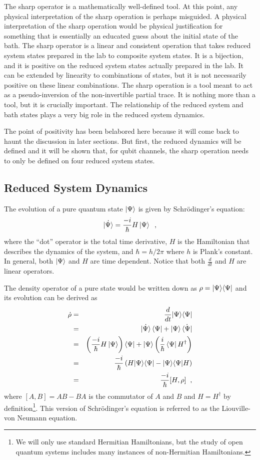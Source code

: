 The sharp operator is a mathematically well-defined tool.  At this point, any physical interpretation of the sharp operation is perhaps misguided.  A physical interpretation of the sharp operation would be physical justification for something that is essentially an educated guess about the initial state of the bath.  The sharp operator is a linear and consistent operation that takes reduced system states prepared in the lab to composite system states.  It is a bijection, and it is positive on the reduced system states actually prepared in the lab.  It can be extended by linearity to combinations of states, but it is not necessarily positive on these linear combinations.  The sharp operation is a tool meant to act as a pseudo-inversion of the non-invertible partial trace.  It is nothing more than a tool, but it is crucially important.  The relationship of the reduced system and bath states plays a very big role in the reduced system dynamics.  

The point of positivity has been belabored here because it will come back to haunt the discussion in later sections.  But first, the reduced dynamics will be defined and it will be shown that, for qubit channels, the sharp operation needs to only be defined on four reduced system states.

\subsection{Reduced System Dynamics}
\label{sec:map}      
The evolution of a pure quantum state $\left|\Psi\right\rangle$ is given by Schr\"{o}dinger's equation:
$$
\dot{\left|\Psi\right\rangle} = \frac{-i}{\hbar} H \left|\Psi\right\rangle\;\;,
$$
where the ``dot'' operator is the total time derivative, $H$ is the Hamiltonian that describes the dynamics of the system, and $\hbar=h/2\pi$ where $h$ is Plank's constant.  In general, both $\left|\Psi\right\rangle$ and $H$ are time dependent.  Notice that both $\frac{d}{dt}$ and $H$ are linear operators.

The density operator of a pure state would be written down as $\rho = |\Psi\rangle\langle\Psi|$ and its evolution can be derived as
\begin{eqnarray*}
\dot{\rho} &=& \frac{d}{dt} |\Psi\rangle\langle\Psi|\\
&=& \dot{\left|\Psi\right\rangle}\left\langle\Psi\right|+\left|\Psi\right\rangle\dot{\left\langle\Psi\right|}\\
&=& \left(\frac{-i}{\hbar} H \left|\Psi\right\rangle\right)\left\langle\Psi\right|+\left|\Psi\right\rangle\left(\frac{i}{\hbar} \left\langle\Psi\right|H^\dagger\right)\\
&=& \frac{-i}{\hbar}\left(H|\Psi\rangle\langle\Psi|-|\Psi\rangle\langle\Psi|H\right)\\
&=& \frac{-i}{\hbar} [H,\rho]\;\;,
\end{eqnarray*}
where $[A,B] = AB-BA$ is the commutator of $A$ and $B$ and $H=H^\dagger$ by definition\footnote{We will only use standard Hermitian Hamiltonians, but the study of open quantum systems includes many instances of non-Hermitian Hamiltonians.}.  This version of Schr\"{o}dinger's equation is referred to as the Liouville-von Neumann equation.

